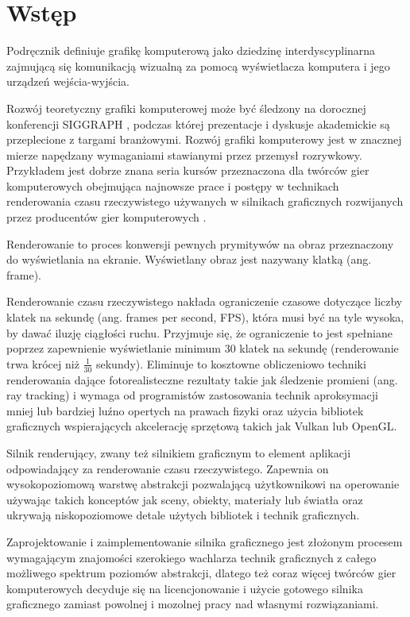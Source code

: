 \chapter{Wstęp}
\label{chap:introduction}

Podręcznik \cite{HughesDamEtAl13} definiuje grafikę komputerową jako dziedzinę interdyscyplinarna zajmującą się komunikacją wizualną za pomocą wyświetlacza komputera i jego urządzeń wejścia-wyjścia.

Rozwój teoretyczny grafiki komputerowej może być śledzony na dorocznej konferencji SIGGRAPH \cite{SIGGRAPH}, podczas której prezentacje i dyskusje akademickie są przeplecione z targami branżowymi.
Rozwój grafiki komputerowy jest w znacznej mierze napędzany wymaganiami stawianymi przez przemysł rozrywkowy. Przykładem jest dobrze znana seria kursów przeznaczona dla twórców gier komputerowych obejmująca najnowsze prace i postępy w technikach renderowania czasu rzeczywistego używanych w silnikach graficznych rozwijanych przez producentów gier komputerowych \cite{SIGGRAPH_ADVANCES}.

Renderowanie to proces konwersji pewnych prymitywów na obraz przeznaczony do wyświetlania na ekranie.
Wyświetlany obraz jest nazywany klatką (ang. frame).

Renderowanie czasu rzeczywistego nakłada ograniczenie czasowe dotyczące liczby klatek na sekundę (ang. frames per second, FPS), która musi być na tyle wysoka, by dawać iluzję ciągłości ruchu.
Przyjmuje się, że ograniczenie to jest spełniane poprzez zapewnienie wyświetlanie minimum 30 klatek na sekundę (renderowanie trwa krócej niż $\frac{1}{30}$ sekundy).
Eliminuje to kosztowne obliczeniowo techniki renderowania dające fotorealisteczne rezultaty takie jak śledzenie promieni (ang. ray tracking) i wymaga od programistów zastosowania technik aproksymacji mniej lub bardziej luźno opertych na prawach fizyki oraz użycia bibliotek graficznych wspierających akcelerację sprzętową takich jak Vulkan lub OpenGL.

Silnik renderujący, zwany też silnikiem graficznym to element aplikacji odpowiadający za renderowanie czasu rzeczywistego. Zapewnia on wysokopoziomową warstwę abstrakcji pozwalającą użytkownikowi na operowanie używając takich konceptów jak sceny, obiekty, materiały lub światła oraz ukrywają niskopoziomowe detale użytych bibliotek i technik graficznych.

Zaprojektowanie i zaimplementowanie silnika graficznego jest złożonym procesem wymagającym znajomości szerokiego wachlarza technik graficznych z całego możliwego spektrum poziomów abstrakcji, dlatego też coraz więcej twórców gier komputerowych decyduje się na licencjonowanie i użycie gotowego silnika graficznego zamiast powolnej i mozolnej pracy nad własnymi rozwiązaniami.

